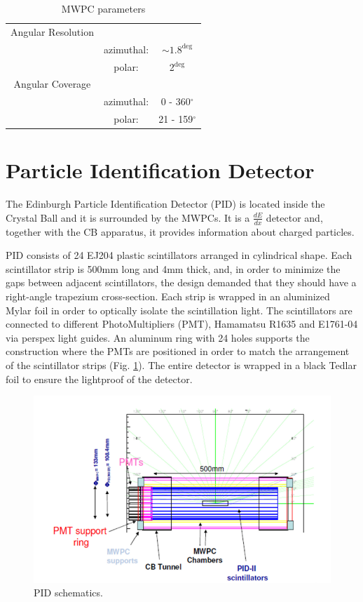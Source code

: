 \begin{table}[ht]
\caption{MWPC parameters}
\centering
\begin{tabular}{c c c}
\hline\hline
Angular Resolution & & \\
 & azimuthal: & $\sim 1.8^{\deg}$ \\
 & polar: & 2$^{\deg}$ \\
\hline
Angular Coverage & & \\
 & azimuthal: & 0 - 360$^{\circ}$ \\
 & polar: & 21 - 159$^{\circ}$ \\
\hline\hline
\end{tabular}
\label{table_mwpc}
\end{table} 

\section{Particle Identification Detector}

\indent The Edinburgh Particle Identification Detector (PID) is located inside the Crystal Ball and it is surrounded by the MWPCs. It is a $\frac{dE}{dx}$ detector and, together with the CB apparatus, it provides information about charged particles.

\indent PID consists of 24 EJ204 plastic scintillators arranged in cylindrical shape. Each scintillator strip is 500mm long and 4mm thick, and, in order to minimize the gaps between adjacent scintillators, the design demanded that they should have a right-angle trapezium cross-section. Each strip is wrapped in an aluminized Mylar foil in order to  optically  isolate  the scintillation  light.  The  scintillators  are  connected  to different PhotoMultipliers (PMT), Hamamatsu R1635 and E1761-04 via perspex light guides. An aluminum ring with 24 holes supports the construction  where the PMTs are positioned in order to match the arrangement of  the  scintillator  strips (Fig. \ref{pid}).  The  entire detector is wrapped in a black Tedlar foil to ensure the lightproof of the detector.

\begin{figure}[H]
\begin{center}
\includegraphics[scale=0.5]{pictures/png/pidschematics.png}
\caption{PID schematics.}
\label{pid}
\end{center}
\end{figure}

